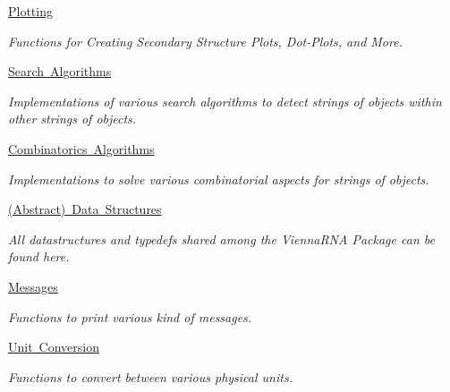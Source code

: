 \begin{DoxyCompactItemize}
\mbox{\hyperlink{group__plotting__utils}{Plotting}}
\begin{DoxyCompactList}\small\item\em Functions for Creating Secondary Structure Plots, Dot-\/\+Plots, and More. \end{DoxyCompactList}\item 
\mbox{\hyperlink{group__search__utils}{Search Algorithms}}
\begin{DoxyCompactList}\small\item\em Implementations of various search algorithms to detect strings of objects within other strings of objects. \end{DoxyCompactList}\item 
\mbox{\hyperlink{group__combinatorics__utils}{Combinatorics Algorithms}}
\begin{DoxyCompactList}\small\item\em Implementations to solve various combinatorial aspects for strings of objects. \end{DoxyCompactList}\item 
\mbox{\hyperlink{group__data__structures}{(\+Abstract) Data Structures}}
\begin{DoxyCompactList}\small\item\em All datastructures and typedefs shared among the Vienna\+R\+NA Package can be found here. \end{DoxyCompactList}\item 
\mbox{\hyperlink{group__message__utils}{Messages}}
\begin{DoxyCompactList}\small\item\em Functions to print various kind of messages. \end{DoxyCompactList}\item 
\mbox{\hyperlink{group__units}{Unit Conversion}}
\begin{DoxyCompactList}\small\item\em Functions to convert between various physical units. \end{DoxyCompactList}\end{DoxyCompactItemize}
